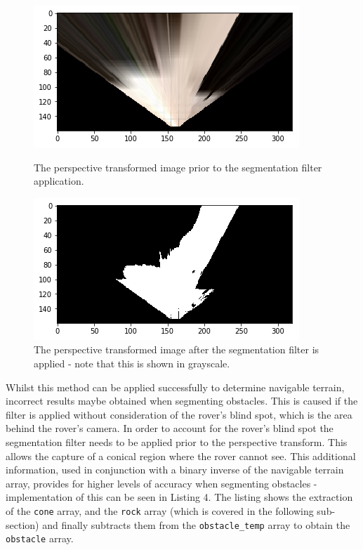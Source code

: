 \documentclass[a4paper]{article}
\begin{document}
\vspace{0.5cm}

\begin{figure}[h]
\centering
	\begin{minipage}[t]{0.45\linewidth}
	\centering
	\includegraphics[scale=0.5]{image6}
	\caption{The perspective transformed image prior to the segmentation filter application.}
	\end{minipage}
	\hspace{0.5cm}
	\begin{minipage}[t]{0.45\linewidth}
	\centering
	\includegraphics[scale=0.5]{image7}
	\caption{The perspective transformed image after the segmentation filter is applied - note that this is shown in grayscale.}
	\end{minipage}
\end{figure}

\newpage

Whilst this method can be applied successfully to determine navigable terrain, incorrect results maybe obtained when segmenting obstacles. This is caused if the filter is applied without consideration of the rover's blind spot, which is the area behind the rover's camera. In order to account for the rover's blind spot the segmentation filter needs to be applied prior to the perspective transform. This allows the capture of a conical region where the rover cannot see. This additional information, used in conjunction with a binary inverse of the navigable terrain array, provides for higher levels of accuracy when segmenting obstacles - implementation of this can be seen in Listing 4. The listing shows the extraction of the \verb|cone| array, and the \verb|rock| array (which is covered in the following sub-section) and finally subtracts them from the \verb|obstacle_temp| array to obtain the \verb|obstacle| array.\\
\end{document}
